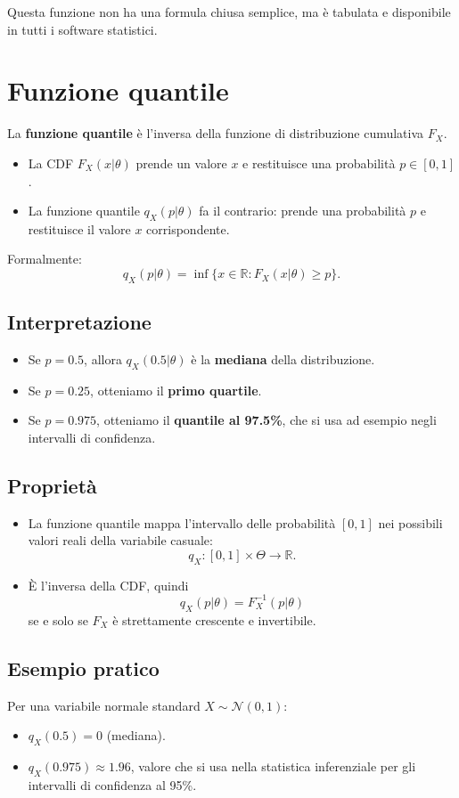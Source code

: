 \documentclass[a4paper,12pt]{article}
\begin{document}
	Questa funzione non ha una formula chiusa semplice, ma è tabulata e disponibile in tutti i software statistici.
	
\section*{Funzione quantile}

La \textbf{funzione quantile} è l'inversa della funzione di distribuzione cumulativa $F_X$.  

\begin{itemize}
	\item La CDF $F_X(x|\theta)$ prende un valore $x$ e restituisce una probabilità $p \in [0,1]$.  
	\item La funzione quantile $q_X(p|\theta)$ fa il contrario: prende una probabilità $p$ e restituisce il valore $x$ corrispondente.  
\end{itemize}

Formalmente:
\[
q_X(p|\theta) = \inf \{ x \in \mathbb{R} : F_X(x|\theta) \geq p \}.
\]

\subsection*{Interpretazione}
\begin{itemize}
	\item Se $p=0.5$, allora $q_X(0.5|\theta)$ è la \textbf{mediana} della distribuzione.  
	\item Se $p=0.25$, otteniamo il \textbf{primo quartile}.  
	\item Se $p=0.975$, otteniamo il \textbf{quantile al 97.5\%}, che si usa ad esempio negli intervalli di confidenza.  
\end{itemize}

\subsection*{Proprietà}
\begin{itemize}
	\item La funzione quantile mappa l'intervallo delle probabilità $[0,1]$ nei possibili valori reali della variabile casuale:
	\[
	q_X : [0,1] \times \Theta \to \mathbb{R}.
	\]
	\item È l'inversa della CDF, quindi
	\[
	q_X(p|\theta) = F_X^{-1}(p|\theta)
	\]
	se e solo se $F_X$ è strettamente crescente e invertibile.
\end{itemize}

\subsection*{Esempio pratico}
Per una variabile normale standard $X \sim \mathcal{N}(0,1)$:
\begin{itemize}
	\item $q_X(0.5) = 0$ (mediana).  
	\item $q_X(0.975) \approx 1.96$, valore che si usa nella statistica inferenziale per gli intervalli di confidenza al 95\%.  
\end{itemize}

	
\end{document}
